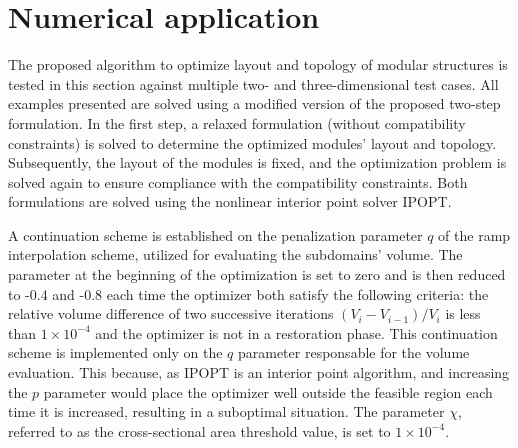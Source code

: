 \section{Numerical application}\label{sec:06_num_app}
The proposed algorithm to optimize layout and topology of modular structures is tested in this section against multiple two- and three-dimensional test cases. All examples presented are solved using a modified version of the proposed two-step formulation. In the first step, a relaxed formulation (without compatibility constraints) is solved to determine the optimized modules' layout and topology. Subsequently, the layout of the modules is fixed, and the optimization problem is solved again to ensure compliance with the compatibility constraints. Both formulations are solved using the nonlinear interior point solver IPOPT.

A continuation scheme is established on the penalization parameter $q$ of the \gls{ramp} interpolation scheme, utilized for evaluating the subdomains' volume. The parameter at the beginning of the optimization is set to zero and is then reduced to -0.4 and -0.8 each time the optimizer both satisfy the following criteria: the relative volume difference of two successive iterations $(V_i-V_{i-1})/V_i$ is less than $1 \times 10^{-4}$ and the optimizer is not in a restoration phase. This continuation scheme is implemented only on the $q$ parameter responsable for the volume evaluation. This because, as IPOPT is an interior point algorithm, and  increasing the $p$ parameter would place the optimizer well outside the feasible region each time it is increased, resulting in a suboptimal situation. The parameter $\chi$, referred to as the cross-sectional area threshold value, is set to $1 \times 10^{-4}$. 

